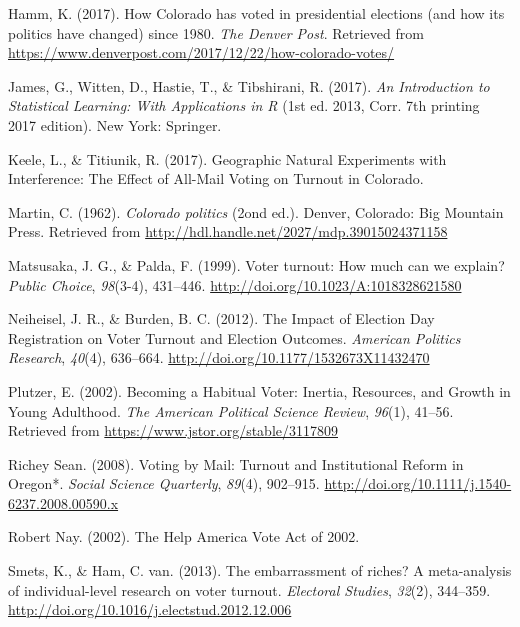 \documentclass[12pt,twoside]{reedthesis}
\begin{document}
  \hypertarget{ref-hamm_how_2017}{}
  Hamm, K. (2017). How Colorado has voted in presidential elections (and
  how its politics have changed) since 1980. \emph{The Denver Post}.
  Retrieved from
  \url{https://www.denverpost.com/2017/12/22/how-colorado-votes/}
  
  \hypertarget{ref-james_introduction_2017}{}
  James, G., Witten, D., Hastie, T., \& Tibshirani, R. (2017). \emph{An
  Introduction to Statistical Learning: With Applications in R} (1st ed.
  2013, Corr. 7th printing 2017 edition). New York: Springer.
  
  \hypertarget{ref-keele_geographic_2017}{}
  Keele, L., \& Titiunik, R. (2017). Geographic Natural Experiments with
  Interference: The Effect of All-Mail Voting on Turnout in Colorado.
  
  \hypertarget{ref-martin_colorado_1962}{}
  Martin, C. (1962). \emph{Colorado politics} (2ond ed.). Denver,
  Colorado: Big Mountain Press. Retrieved from
  \url{http://hdl.handle.net/2027/mdp.39015024371158}
  
  \hypertarget{ref-matsusaka_voter_1999}{}
  Matsusaka, J. G., \& Palda, F. (1999). Voter turnout: How much can we
  explain? \emph{Public Choice}, \emph{98}(3-4), 431--446.
  \url{http://doi.org/10.1023/A:1018328621580}
  
  \hypertarget{ref-neiheisel_impact_2012}{}
  Neiheisel, J. R., \& Burden, B. C. (2012). The Impact of Election Day
  Registration on Voter Turnout and Election Outcomes. \emph{American
  Politics Research}, \emph{40}(4), 636--664.
  \url{http://doi.org/10.1177/1532673X11432470}
  
  \hypertarget{ref-plutzer_becoming_2002}{}
  Plutzer, E. (2002). Becoming a Habitual Voter: Inertia, Resources, and
  Growth in Young Adulthood. \emph{The American Political Science Review},
  \emph{96}(1), 41--56. Retrieved from
  \url{https://www.jstor.org/stable/3117809}
  
  \hypertarget{ref-richey_sean_voting_2008}{}
  Richey Sean. (2008). Voting by Mail: Turnout and Institutional Reform in
  Oregon*. \emph{Social Science Quarterly}, \emph{89}(4), 902--915.
  \url{http://doi.org/10.1111/j.1540-6237.2008.00590.x}
  
  \hypertarget{ref-robert_nay_help_2002}{}
  Robert Nay. (2002). The Help America Vote Act of 2002.
  
  \hypertarget{ref-smets_embarrassment_2013}{}
  Smets, K., \& Ham, C. van. (2013). The embarrassment of riches? A
  meta-analysis of individual-level research on voter turnout.
  \emph{Electoral Studies}, \emph{32}(2), 344--359.
  \url{http://doi.org/10.1016/j.electstud.2012.12.006}
  
\end{document}
